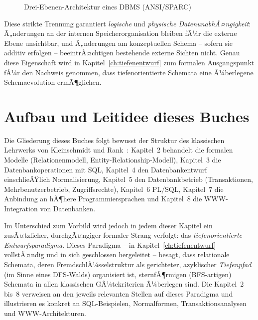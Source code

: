 ﻿\documentclass[a4paper,12pt]{report}
\theoremstyle{definition}
\theoremstyle{remark}
\begin{document}
\begin{figure}[H]
\centering
{}
\caption{Drei-Ebenen-Architektur eines DBMS (ANSI/SPARC)}
\label{fig:ansi-sparc}
\end{figure}

Diese strikte Trennung garantiert \emph{logische} und \emph{physische
DatenunabhÃ¤ngigkeit}: Ã„nderungen an der internen Speicherorganisation
bleiben fÃ¼r die externe Ebene unsichtbar, und Ã„nderungen am
konzeptuellen Schema -- sofern sie additiv erfolgen -- beeintrÃ¤chtigen
bestehende externe Sichten nicht. Genau diese Eigenschaft wird in
Kapitel~\ref{ch:tiefenentwurf} zum formalen Ausgangspunkt fÃ¼r den
Nachweis genommen, dass tiefenorientierte Schemata eine Ã¼berlegene
Schemaevolution ermÃ¶glichen.

\section{Aufbau und Leitidee dieses Buches}

Die Gliederung dieses Buches folgt bewusst der Struktur des klassischen
Lehrwerks von Kleinschmidt und Rank~\cite{Kleinschmidt2002}: Kapitel~2
behandelt die formalen Modelle (Relationenmodell,
Entity-Relationship-Modell), Kapitel~3 die Datenbankoperationen mit SQL,
Kapitel~4 den Datenbankentwurf einschlieÃŸlich Normalisierung,
Kapitel~5 den Datenbankbetrieb (Transaktionen, Mehrbenutzerbetrieb,
Zugriffsrechte), Kapitel~6 PL/SQL, Kapitel~7 die Anbindung an hÃ¶here
Programmiersprachen und Kapitel~8 die WWW-Integration von Datenbanken.

Im Unterschied zum Vorbild wird jedoch in jedem dieser Kapitel ein
zusÃ¤tzlicher, durchgÃ¤ngiger formaler Strang verfolgt: das
\emph{tiefenorientierte Entwurfsparadigma}. Dieses Paradigma -- in
Kapitel~\ref{ch:tiefenentwurf} vollstÃ¤ndig und in sich geschlossen
hergeleitet -- besagt, dass relationale Schemata, deren
FremdschlÃ¼sselstruktur als gerichteter, azyklischer \emph{Tiefenpfad}
(im Sinne eines DFS-Walds) organisiert ist, sternfÃ¶rmigen
(BFS-artigen) Schemata in allen klassischen GÃ¼tekriterien Ã¼berlegen
sind. Die Kapitel~2 bis~8 verweisen an den jeweils relevanten Stellen
auf dieses Paradigma und illustrieren es konkret an SQL-Beispielen,
Normalformen, Transaktionsanalysen und WWW-Architekturen.
\end{document}
